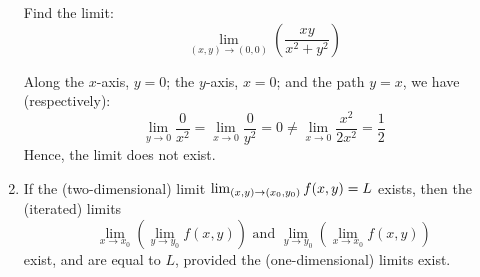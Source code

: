 \begin{enumerate}
    \begin{example}
        \normalfont Find the limit:
        $$\lim_{(x, y) \to (0, 0)} \left( \frac{xy}{x^2 + y^2} \right)$$

        Along the $x$-axis, $y = 0$; the $y$-axis, $x = 0$; and the path $y = x$, we have (respectively):
        $$\lim_{y \to 0} \frac{0}{x^2} = \lim_{x \to 0} \frac{0}{y^2} = 0 \neq \lim_{x \to 0} \frac{x^2}{2x^2} = \frac{1}{2}$$
        Hence, the limit does not exist.
    \end{example}

    \item If the (two-dimensional) limit $\lim_{(x, y) \to (x_0, y_0)} f(x, y) = L$
    exists, then the (iterated) limits
    $$\lim_{x \to x_0}\left( \lim_{y \to y_0} f(x, y) \right) \text{ and } \lim_{y \to y_0}\left( \lim_{x \to x_0} f(x, y) \right)$$
    exist, and are equal to $L$, provided the (one-dimensional) limits exist.
\end{enumerate}